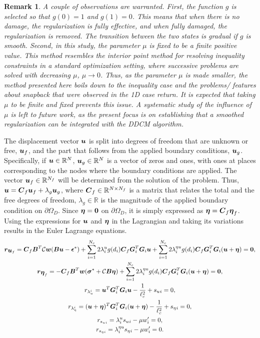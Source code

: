 \documentclass[10pt]{cas-sc}
\newtheorem*{remark}{Remark}
\begin{document}
\begin{remark}
	A couple of observations are warranted. First, the function $g$ is selected so that $g(0)=1$ and $g(1)=0$. This means that when there is no damage, the regularization is fully effective, and when fully damaged, the regularization is removed. The transition between the two states is gradual if $g$ is smooth. Second, in this study, the parameter $\mu$ is fixed to be a finite positive value. This method resembles the interior point method for resolving inequality constraints in a standard optimization setting, where successive problems are solved with decreasing $\mu$, $\mu \to 0$. Thus, as the parameter $\mu$ is made smaller, the method presented here boils down to the inequality case and the problems/ features about snapback that were observed in the 1D case return. It is expected that taking $\mu$ to be finite and fixed prevents this issue. A systematic study of the influence of $\mu$ is left to future work, as the present focus is on establishing that a smoothed regularization can be integrated with the DDCM algorithm.
\end{remark}
The displacement vector $\mbox{\boldmath $u$}$ is split into degrees of freedom that are unknown or free, $\mbox{\boldmath $u$}_f$, and the part that follows from the applied boundary conditions, $\mbox{\boldmath $u$}_g$. Specifically, if $\mbox{\boldmath $u$} \in \mathbb{R}^N$, $\mbox{\boldmath $u$}_g \in \mathbb{R}^N$ is a vector of zeros and ones, with ones at places corresponding to the nodes where the boundary conditions are applied. The vector $\mbox{\boldmath $u$}_f \in \mathbb{R}^{N_f}$ will be determined from the solution of the problem. Thus, $\mbox{\boldmath $u$} = \mbox{\boldmath $C$}_f \mbox{\boldmath $u$}_f + \lambda_g \mbox{\boldmath $u$}_g$, where $\mbox{\boldmath $C$}_f \in \mathbb{R}^{N \times N_f} $ is a matrix that relates the total and the free degrees of freedom, $\lambda_g \in \mathbb{R}$ is the magnitude of the applied boundary condition on $\partial \Omega_D$. Since $\mbox{\boldmath $\eta$} = \bf0$ on $\partial \Omega_D$, it is simply expressed as $\mbox{\boldmath $\eta$} = \mbox{\boldmath $C$}_f \mbox{\boldmath $\eta$}_f$. Using the expressions for $\mbox{\boldmath $u$}$ and $\mbox{\boldmath $\eta$}$ in the Lagrangian and taking its variations results in the  Euler Lagrange equations.
\begin{gather}
	\mbox{\boldmath $r$}_{\mbox{\boldmath $u$}_f} = \mbox{\boldmath $C$}_f \mbox{\boldmath $B$}^T \mathcal{C} \mbox{\boldmath $w$}(\mbox{\boldmath $B$} \mbox{\boldmath $u$} - \mbox{\boldmath $\epsilon$}^*) + \sum_{i=1}^{N_c} 2 \lambda^u_i  g(d_i) \mbox{\boldmath $C$}_f \mbox{\boldmath $G$}_i ^T \mbox{\boldmath $G$}_i \mbox{\boldmath $u$} 
	+\sum_{i=1}^{N_c} 2 \lambda^{\eta u}_i  g(d_i) \mbox{\boldmath $C$}_f \mbox{\boldmath $G$}_i ^T \mbox{\boldmath $G$}_i (\mbox{\boldmath $u$}+\mbox{\boldmath $\eta$}) = \bf0, \label{all_equations_first_one} \\
	\mbox{\boldmath $r$}_{\mbox{\boldmath $\eta$}_f} = -\mbox{\boldmath $C$}_f \mbox{\boldmath $B$}^T \mbox{\boldmath $w$}(\mbox{\boldmath $\sigma$}^*+ \mathcal{C} \mbox{\boldmath $B$} \mbox{\boldmath $\eta$} ) 
	+\sum_{i=1}^{N_c} 2 \lambda^{\eta u}_i  g(d_i) \mbox{\boldmath $C$}_f \mbox{\boldmath $G$}_i ^T \mbox{\boldmath $G$}_i (\mbox{\boldmath $u$}+\mbox{\boldmath $\eta$}) = \bf0, \\
	r_{\lambda_u^ i} = \mbox{\boldmath $u$} ^T \mbox{\boldmath $G$}_i ^T \mbox{\boldmath $G$}_i \mbox{\boldmath $u$} - \frac{1}{\ell_c ^2} +  s_u{_i} = 0, \\
	r_{\lambda_\eta^ i} = (\mbox{\boldmath $u$}+\mbox{\boldmath $\eta$}) ^T \mbox{\boldmath $G$}_i ^T \mbox{\boldmath $G$}_i (\mbox{\boldmath $u$}+\mbox{\boldmath $\eta$}) - \frac{1}{\ell_c ^2} +  s_\eta{_i} = 0, \\ 
	r_{s_u{_i}} = \lambda^u_i s_u{_i} - \mu w_i'   = 0, \\
	r_{s_\eta{_i}} = \lambda^{\eta u}_i s_\eta{_i} - \mu w_i'   = 0.\label{all_equations_last_one} 
\end{gather}
\end{document}
